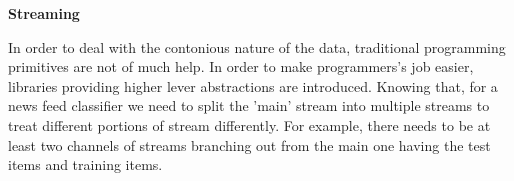 \begin{center} \textbf{\huge Streaming} \end{center}
In order to deal with the contonious nature of the data, traditional programming primitives are not of much help. In order to make programmers's job easier, libraries providing higher lever abstractions are introduced. Knowing that, for a news feed classifier we need to split the 'main' stream into multiple streams to treat different portions of stream differently. For example, there needs to be at least two channels of streams branching out from the main one having the test items and training items. 

